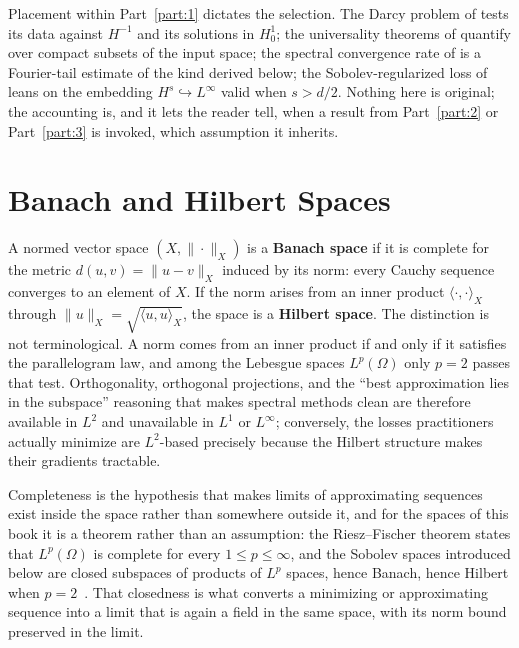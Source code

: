 Placement within Part~\ref{part:1} dictates the selection. The Darcy problem of  tests its data against $H^{-1}$ and its solutions in $H^1_0$; the universality theorems of  quantify over compact subsets of the input space; the spectral convergence rate of  is a Fourier-tail estimate of the kind derived below; the Sobolev-regularized loss of  leans on the embedding $H^s \hookrightarrow L^\infty$ valid when $s > d/2$. Nothing here is original; the accounting is, and it lets the reader tell, when a result from Part~\ref{part:2} or Part~\ref{part:3} is invoked, which assumption it inherits.

\section{Banach and Hilbert Spaces}

A normed vector space $(X, \|\cdot\|_X)$ is a \textbf{Banach space} if it is complete for the metric $d(u,v) = \|u - v\|_X$ induced by its norm: every Cauchy sequence converges to an element of $X$. If the norm arises from an inner product $\langle \cdot, \cdot \rangle_X$ through $\|u\|_X = \sqrt{\langle u, u \rangle_X}$, the space is a \textbf{Hilbert space}. The distinction is not terminological. A norm comes from an inner product if and only if it satisfies the parallelogram law, and among the Lebesgue spaces $L^p(\Omega)$ only $p = 2$ passes that test. Orthogonality, orthogonal projections, and the ``best approximation lies in the subspace'' reasoning that makes spectral methods clean are therefore available in $L^2$ and unavailable in $L^1$ or $L^\infty$; conversely, the losses practitioners actually minimize are $L^2$-based precisely because the Hilbert structure makes their gradients tractable.

Completeness is the hypothesis that makes limits of approximating sequences exist inside the space rather than somewhere outside it, and for the spaces of this book it is a theorem rather than an assumption: the Riesz--Fischer theorem states that $L^p(\Omega)$ is complete for every $1 \le p \le \infty$, and the Sobolev spaces introduced below are closed subspaces of products of $L^p$ spaces, hence Banach, hence Hilbert when $p = 2$~\cite{brezis2011functional}. That closedness is what converts a minimizing or approximating sequence into a limit that is again a field in the same space, with its norm bound preserved in the limit.

